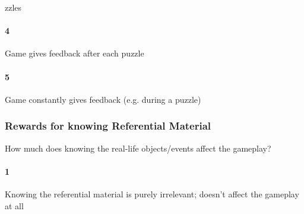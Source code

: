 zzles\paragraph{4}Game gives feedback after each puzzle\paragraph{5}Game constantly gives feedback (e.g. during a puzzle)\subsubsection{Rewards for knowing Referential Material}How much does knowing the real-life objects/events affect the gameplay?\paragraph{1}Knowing the referential material is purely irrelevant; doesn't affect the gameplay at all\paragra